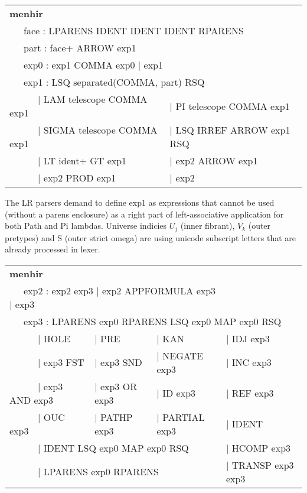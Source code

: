 \documentclass{article}
\theoremstyle{definition}
\newcommand{\tabstyle}[0]{\scriptsize\ttfamily\fontseries{l}\selectfont}
\begin{document}
\begin{table}[ht!]
\tabstyle
\begin{tabular}{ll}
\textbf{menhir} \\
\multicolumn{2}{l}{\ \ \ face : LPARENS IDENT IDENT IDENT RPARENS } \\
\multicolumn{2}{l}{\ \ \ part : face+ ARROW exp1 } \\
\multicolumn{2}{l}{\ \ \ exp0 : exp1 COMMA exp0 | exp1 } \\
\multicolumn{2}{l}{\ \ \ exp1 : LSQ separated(COMMA, part) RSQ } \\
\ \ \ \ \ \ | LAM telescope COMMA exp1   & | PI telescope COMMA exp1 \\
\ \ \ \ \ \ | SIGMA telescope COMMA exp1 & | LSQ IRREF ARROW exp1 RSQ \\
\ \ \ \ \ \ | LT ident+ GT exp1          & | exp2 ARROW exp1 \\
\ \ \ \ \ \ | exp2 PROD exp1             & | exp2 \\
\end{tabular}
\end{table}

The LR parsers demand to define exp1 as expressions that cannot be used (without a parens enclosure)
as a right part of left-associative application for both Path and Pi lambdas.
Universe indicies $U_j$ (inner fibrant), $V_k$ (outer pretypes) and S (outer strict omega)
are using unicode subscript letters that are already processed in lexer.

\begin{table}[ht!]
\tabstyle
\begin{tabular}{llll}
\textbf{menhir} \\
\multicolumn{3}{l}{\ \ \ exp2 : exp2 exp3 | exp2 APPFORMULA exp3 | exp3 } \\
\multicolumn{4}{l}{\ \ \ exp3 : LPARENS exp0 RPARENS LSQ exp0 MAP exp0 RSQ } \\
\ \ \ \ \ \   | HOLE              & | PRE          & | KAN          & | IDJ exp3 \\
\ \ \ \ \ \   | exp3 FST          & | exp3 SND     & | NEGATE exp3  & | INC exp3 \\
\ \ \ \ \ \   | exp3 AND exp3     & | exp3 OR exp3 & | ID exp3      & | REF exp3\\
\ \ \ \ \ \   | OUC exp3          & | PATHP exp3   & | PARTIAL exp3 & | IDENT \\
\multicolumn{3}{l}{\ \ \ \ \ \    | IDENT LSQ exp0 MAP exp0 RSQ }   & | HCOMP exp3 \\
\multicolumn{3}{l}{\ \ \ \ \ \    | LPARENS exp0 RPARENS }          & | TRANSP exp3 exp3 \\
\end{tabular}
\end{table}
\end{document}
